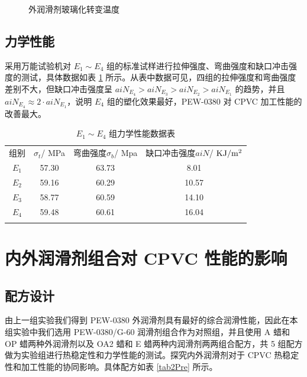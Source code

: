 \begin{figure}[!htb]
    \begin{center}
        
    \end{center}
    \caption{外润滑剂玻璃化转变温度}
    \label{fig1Tg}
\end{figure}

\subsection{力学性能}

采用万能试验机对 $E_1 \sim E_4$ 组的标准试样进行拉伸强度、弯曲强度和缺口冲击强度的测试，具体数据如表 \ref{tab1Mach} 所示。从表中数据可见，四组的拉伸强度和弯曲强度差别不大，但缺口冲击强度呈 $aiN_{E_4} > aiN_{E_3} > aiN_{E_2} > aiN_{E_1}$ 的趋势，并且 $aiN_{E_4} \approx 2 \cdot aiN_{E_1}$，说明 $E_4$ 组的塑化效果最好，PEW-0380 对 CPVC 加工性能的改善最大。

\begin{table}[!htb]
    \caption{$E_1 \sim E_4$ 组力学性能数据表}
    \label{tab1Mach}
    \begin{center}
    \footnotesize{
        \begin{tabular}{cccc}
			\Xhline{1pt}
			组别 & \makecell[c]{$\sigma_t$/\\MPa} & \makecell[c]{弯曲强度$\sigma_{b}$/\\Mpa} & \makecell[c]{缺口冲击强度$aiN$/\\$\rm{KJ/m^2}$}\\
			\Xhline{0.5pt}
			$E_1$ & 57.30 & 63.73 & 8.01	\\
			$E_2$ & 59.16 & 60.29 & 10.57	\\
			$E_3$ & 58.77 & 60.59 & 14.10	\\
			$E_4$ & 59.48 & 60.61 & 16.04	\\
			\Xhline{1pt}
        \end{tabular}
    }
    \end{center}
\end{table}

\section{内外润滑剂组合对 CPVC 性能的影响}

\subsection{配方设计}
由上一组实验我们得到 PEW-0380 外润滑剂具有最好的综合润滑性能，因此在本组实验中我们选用 PEW-0380/G-60 润滑剂组合作为对照组，并且使用 A 蜡和 OP 蜡两种外润滑剂以及 OA2 蜡和 E 蜡两种内润滑剂两两组合配方，共 5 组配方做为实验组进行热稳定性和力学性能的测试。探究内外润滑剂对于 CPVC 热稳定性和加工性能的协同影响。具体配方如表 \ref{tab2Pre} 所示。

